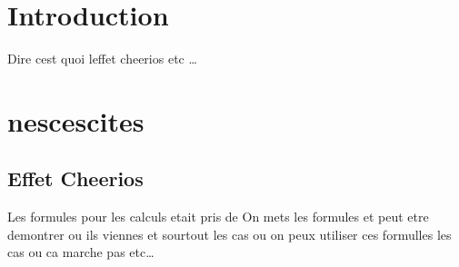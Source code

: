 \documentclass[a4paper, 11pt, oneside]{article} %
\begin{document}
 

\newpage
\section*{Introduction}
    Dire cest quoi leffet cheerios etc \ldots

    \section{nescescites}
    \subsection{Effet Cheerios}
    Les formules pour les calculs etait pris de \cite{cheerios_2005} 
    On mets les formules et peut etre demontrer ou ils viennes et sourtout les cas ou on peux utiliser ces formulles les cas ou ca marche pas etc\ldots
\end{document}
